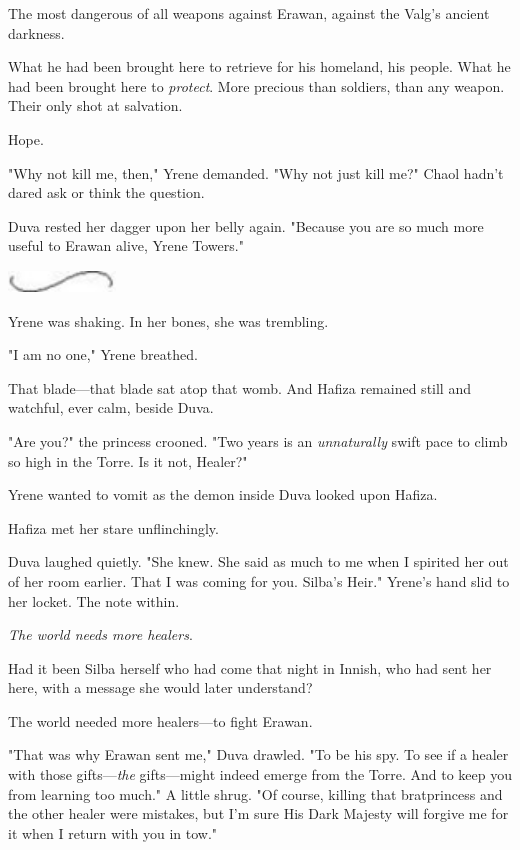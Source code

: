 The most dangerous of all weapons against Erawan, against the Valg's ancient darkness.

What he had been brought here to retrieve for his homeland, his people.
What he had been brought here to \emph{protect}.
More precious than soldiers, than any weapon.
Their only shot at salvation.

Hope.

"Why not kill me, then," Yrene demanded.
"Why not just kill me?"
Chaol hadn't dared ask or think the question.

Duva rested her dagger upon her belly again.
"Because you are so much more useful to Erawan alive, Yrene Towers."

\begin{center}
	\includegraphics[width=1.12in,height=0.24in]{images/seperator}
\end{center}

Yrene was shaking.
In her bones, she was trembling.

"I am no one," Yrene breathed.

That blade---that blade sat atop that womb.
And Hafiza remained still and watchful, ever calm, beside Duva.

"Are you?"
the princess crooned.
"Two years is an \emph{unnaturally}
swift pace to climb so high in the Torre.
Is it not, Healer?"

Yrene wanted to vomit as the demon inside Duva looked upon Hafiza.

Hafiza met her stare unflinchingly.

Duva laughed quietly.
"She knew.
She said as much to me when I spirited her out of her room earlier.
That I was coming for you.
Silba's Heir."
Yrene's hand slid to her locket.
The note within.

\emph{The world needs more healers}.

Had it been Silba herself who had come that night in Innish, who had sent her here, with a message she would later understand?

The world needed more healers---to fight Erawan.

"That was why Erawan sent me," Duva drawled.
"To be his spy.
To see if a healer with those gifts---\emph{the} gifts---might indeed emerge from the Torre.
And to keep you from learning too much."
A little shrug.
"Of course, killing that bratprincess and the other healer were  mistakes, but I'm sure His Dark Majesty will forgive me for it when I return with you in tow."

